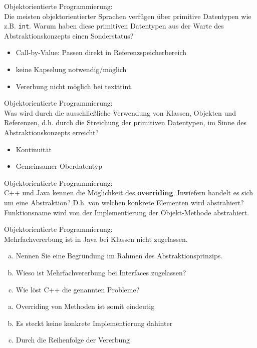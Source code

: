 \begin{card}
	Objektorientierte Programmierung:\\
	Die meisten objektorientierter Sprachen verfügen über primitive Datentypen wie z.B. \texttt{int}. Warum haben diese primitiven Datentypen aus der Warte des Abstraktionskonzepts einen Sonderstatus?
	\hr
	\begin{itemize}
	\item Call-by-Value: Passen direkt in Referenzspeicherbereich
	\item keine Kapselung notwendig/möglich
	\item Vererbung nicht möglich bei texttt{int}.
	\end{itemize}
\end{card}

\begin{card}
	Objektorientierte Programmierung:\\
	Was wird durch die ausschließliche Verwendung von Klassen, Objekten und Referenzen, d.h. durch die Streichung der primitiven Datentypen, im Sinne des Abstraktionskonzepts erreicht?
	\hr
	\begin{itemize}
	\item Kontinuität
	\item Gemeinsamer Oberdatentyp
	\end{itemize}
\end{card}

\begin{card}
	Objektorientierte Programmierung:\\
	C++ und Java kennen die Möglichkeit des \textbf{overriding}. Inwiefern handelt es sich um eine Abstraktion? D.h. von welchen konkrete Elementen wird abstrahiert? 
	\hr
	Funktionsname wird von der Implementierung der Objekt-Methode abstrahiert.
\end{card}

\begin{card}
	Objektorientierte Programmierung:\\
	Mehrfachvererbung ist in Java bei Klassen nicht zugelassen. 
	\begin{enumerate}[a)]
	\item Nennen Sie eine Begründung im Rahmen des Abstraktionsprinzips.
	\item Wieso ist Mehrfachvererbung bei Interfaces zugelassen?
	\item Wie löst C++ die genannten Probleme?
	\end{enumerate}
	\hr
	\begin{enumerate}[a)]
	\item Overriding von Methoden ist somit eindeutig
	\item Es steckt keine konkrete Implementierung dahinter
	\item Durch die Reihenfolge der Vererbung
	\end{enumerate}
\end{card}

